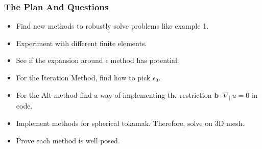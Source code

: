 \documentclass{beamer}
\begin{document}
    \begin{frame}
        \frametitle{The Plan And Questions}
        \begin{itemize}
            \item Find new methods to robustly solve problems like example 1.
            \item Experiment with different finite elements.
            \item See if the expansion around $\epsilon$ method has potential. 
            \item For the Iteration Method, find how to pick $\epsilon_0$.
            \item For the Alt method find a way of implementing the restriction $\mathbf{b}\cdot \nabla_{||}u = 0$ in code. 
            \item Implement methods for spherical tokamak. Therefore, solve on 3D mesh.
\item Prove each method is well posed.
        \end{itemize}

    \end{frame}
    
\end{document}
